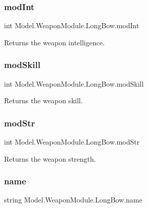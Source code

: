 \subsubsection{\texorpdfstring{mod\+Int}{modInt}}
{\footnotesize\ttfamily int Model.\+Weapon\+Module.\+Long\+Bow.\+mod\+Int\hspace{0.3cm}{\ttfamily [get]}}

Returns the weapon intelligence. \hypertarget{class_model_1_1_weapon_module_1_1_long_bow_a11e8c0740b84af41799a81faf98410b3}{}\label{class_model_1_1_weapon_module_1_1_long_bow_a11e8c0740b84af41799a81faf98410b3} 
\subsubsection{\texorpdfstring{mod\+Skill}{modSkill}}
{\footnotesize\ttfamily int Model.\+Weapon\+Module.\+Long\+Bow.\+mod\+Skill\hspace{0.3cm}{\ttfamily [get]}}

Returns the weapon skill. \hypertarget{class_model_1_1_weapon_module_1_1_long_bow_aefa38571f2e824c436833b8fed1b8e65}{}\label{class_model_1_1_weapon_module_1_1_long_bow_aefa38571f2e824c436833b8fed1b8e65} 
\subsubsection{\texorpdfstring{mod\+Str}{modStr}}
{\footnotesize\ttfamily int Model.\+Weapon\+Module.\+Long\+Bow.\+mod\+Str\hspace{0.3cm}{\ttfamily [get]}}

Returns the weapon strength. \hypertarget{class_model_1_1_weapon_module_1_1_long_bow_a74c5ca976caf85a52e651746e53c9b62}{}\label{class_model_1_1_weapon_module_1_1_long_bow_a74c5ca976caf85a52e651746e53c9b62} 
\subsubsection{\texorpdfstring{name}{name}}
{\footnotesize\ttfamily string Model.\+Weapon\+Module.\+Long\+Bow.\+name\hspace{0.3cm}{\ttfamily [get]}}

